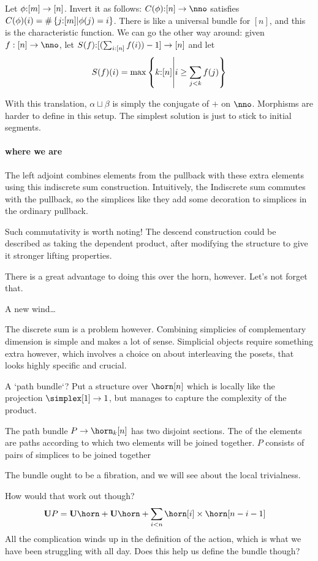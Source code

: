 \documentclass[csh.tex]{subfiles}
\begin{document}
Let $\phi\mathord : [m]\to [n]$. Invert it as follows: $C(\phi)\of [n]\to \nno$
satisfies $C(\phi)(i) = \#\left\{j\mathord : [m]|\phi(j) = i\right\}$. There is like a universal bundle for $[n]$, and this is the characteristic function.
We can go the other way around: given $f:[n]\to\nno$, let $S(f)\mathord :[(\sum_{i\mathord :[n]} f(i)) - 1] \to [n]$ and let 
\[S(f)(i) = \max\left\{ k\mathord :[n] \middle| i \geq \sum_{j < k} f(j) \right\}\]

With this translation, $\alpha\sqcup\beta$ is simply the conjugate of $+$ on $\nno$. Morphisms are harder to define in this setup. The simplest solution is just to stick to initial segments.

\paragraph{where we are}
The left adjoint combines elements from the pullback with these extra elements using this indiscrete sum construction. Intuitively, the Indiscrete sum commutes with the pullback, so the simplices like they add some decoration to simplices in the ordinary pullback.

Such commutativity is worth noting! The descend construction could be described as taking the dependent product, after modifying the structure to give it stronger lifting properties. 

There is a great advantage to doing this over the horn, however. Let's not forget that.

A new wind\dots

The discrete sum is a problem however. Combining simplicies of complementary dimension is simple and makes a lot of sense. Simplicial objects require something extra however, which involves a choice on about  interleaving the posets, that looks highly specific and crucial.


A `path bundle`? Put a structure over $\horn[n]$ which is locally like the projection $\simplex[1]\to 1$, but manages to capture the complexity of the product.

The path bundle $P\to \horn_k[n]$ has two disjoint sections. The of the elements are paths according to which two elements will be joined together. $P$ consists of pairs of simplices to be joined together 

The bundle ought to be a fibration, and we will see about the local trivialness.

How would that work out though? 
\begin{align*}
\base P &= \base \horn + \base \horn + \sum_{i < n} \horn[i]\times\horn
[n-i-1]
\end{align*}
All the complication winds up in the definition of the action, which is what we have been struggling with all day. Does this help us define the bundle though?
\end{document}
